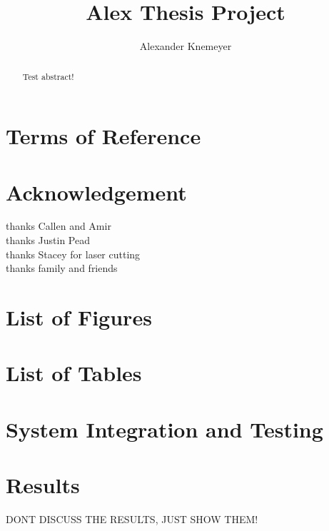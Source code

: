 \documentclass{article}
\begin{document}
\title{Alex Thesis Project}
\author{Alexander Knemeyer}

\maketitle

\newpage

\section{Terms of Reference}

\section{Acknowledgement}
thanks Callen and Amir\\
thanks Justin Pead\\
thanks Stacey for laser cutting\\
thanks family and friends

\begin{abstract}
Test abstract!
\end{abstract}

\section{List of Figures}

\section{List of Tables}

\newpage



\newpage



\newpage



\newpage



\section{System Integration and Testing}

\section{Results}
DONT DISCUSS THE RESULTS, JUST SHOW THEM!
\end{document}
